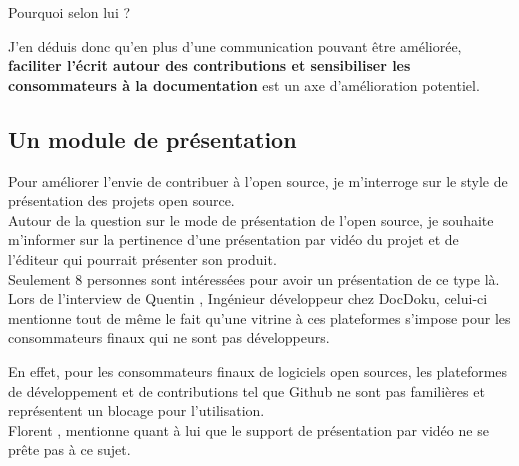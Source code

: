 			Pourquoi selon lui ?

			\begin{center}
				\textit{
				}
			\end{center}

			J'en déduis donc qu'en plus d'une communication pouvant être améliorée, \textbf{faciliter l'écrit autour des contributions et sensibiliser les consommateurs à la documentation} est un axe d'amélioration potentiel.

		\subsection{Un module de présentation}

			Pour améliorer l'envie de contribuer à l'open source, je m'interroge sur le style de présentation des projets open source.\\
			Autour de la question sur le mode de présentation de l'open source, je souhaite m'informer sur la pertinence d'une présentation par vidéo du projet et de l'éditeur qui pourrait présenter son produit.\\
			Seulement 8 personnes sont intéressées pour avoir un présentation de ce type là.\\

			Lors de l'interview de Quentin , Ingénieur développeur chez DocDoku, celui-ci mentionne tout de même le fait qu'une vitrine à ces plateformes s'impose pour les consommateurs finaux qui ne sont pas développeurs.

			\begin{center}
				\textit{
				}
			\end{center}

			En effet, pour les consommateurs finaux de logiciels open sources, les plateformes de développement et de contributions tel que Github ne sont pas familières et représentent un blocage pour l'utilisation.\\

			Florent , mentionne quant à lui que le support de présentation par vidéo ne se prête pas à ce sujet.

